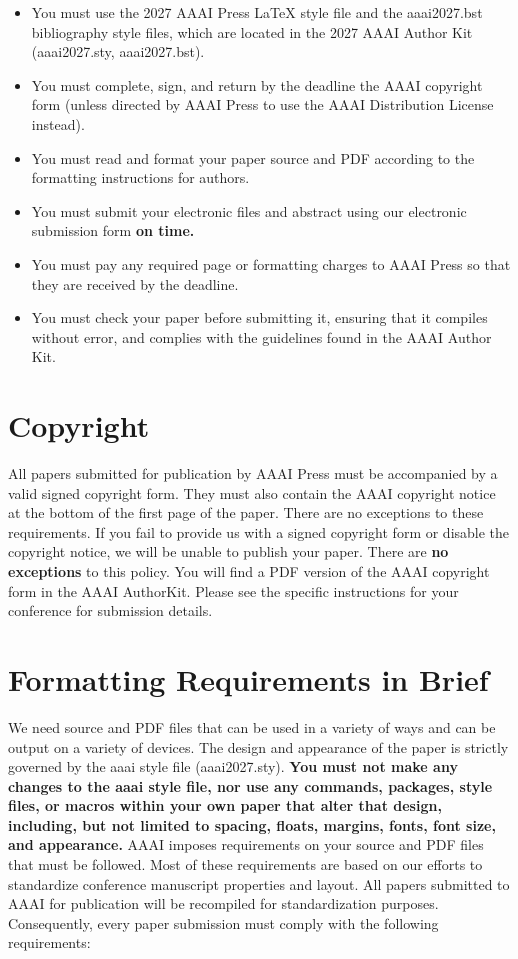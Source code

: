 \begin{itemize}
\item You must use the 2027 AAAI Press \LaTeX{} style file and the aaai2027.bst bibliography style files, which are located in the 2027 AAAI Author Kit (aaai2027.sty, aaai2027.bst).
\item You must complete, sign, and return by the deadline the AAAI copyright form (unless directed by AAAI Press to use the AAAI Distribution License instead).
\item You must read and format your paper source and PDF according to the formatting instructions for authors.
\item You must submit your electronic files and abstract using our electronic submission form \textbf{on time.}
\item You must pay any required page or formatting charges to AAAI Press so that they are received by the deadline.
\item You must check your paper before submitting it, ensuring that it compiles without error, and complies with the guidelines found in the AAAI Author Kit.
\end{itemize}

\section{Copyright}
All papers submitted for publication by AAAI Press must be accompanied by a valid signed copyright form. They must also contain the AAAI copyright notice at the bottom of the first page of the paper. There are no exceptions to these requirements. If you fail to provide us with a signed copyright form or disable the copyright notice, we will be unable to publish your paper. There are \textbf{no exceptions} to this policy. You will find a PDF version of the AAAI copyright form in the AAAI AuthorKit. Please see the specific instructions for your conference for submission details.

\section{Formatting Requirements in Brief}
We need source and PDF files that can be used in a variety of ways and can be output on a variety of devices. The design and appearance of the paper is strictly governed by the aaai style file (aaai2027.sty).
\textbf{You must not make any changes to the aaai style file, nor use any commands, packages, style files, or macros within your own paper that alter that design, including, but not limited to spacing, floats, margins, fonts, font size, and appearance.} AAAI imposes requirements on your source and PDF files that must be followed. Most of these requirements are based on our efforts to standardize conference manuscript properties and layout. All papers submitted to AAAI for publication will be recompiled for standardization purposes. Consequently, every paper submission must comply with the following requirements:

